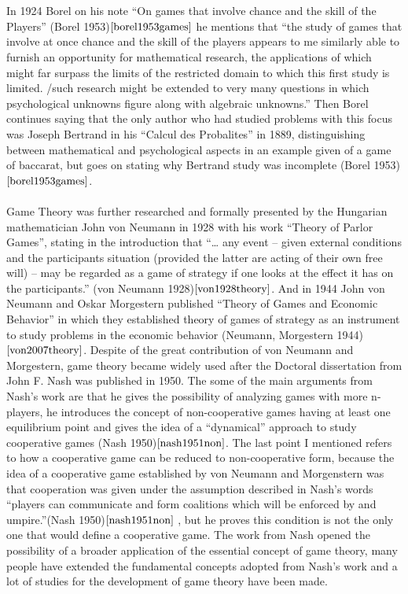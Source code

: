 \documentclass{article}
\begin{document}
\\\\ In 1924 Borel on his note ``On games that involve chance and the skill of the Players'' (Borel 1953)$\cite{borel1953games}$ he mentions that ``the study of games that involve at once chance and the skill of the players appears to me similarly able to furnish an opportunity for mathematical research, the applications of which might far surpass the limits of the restricted domain to which this first study is limited. /such research might be extended to very many questions in which psychological unknowns figure along with algebraic unknowns.'' Then Borel continues saying that the only author who had studied problems with this focus was Joseph Bertrand in his ``Calcul des Probalites'' in 1889, distinguishing between mathematical and psychological aspects in an example given of a game of baccarat, but goes on stating why Bertrand study was incomplete (Borel 1953)$\cite{borel1953games}$.
\\\\ Game Theory was further researched and formally presented by the Hungarian mathematician John von Neumann in 1928 with his work “Theory of Parlor Games”, stating in the introduction that ``… any event – given external conditions and the participants situation (provided the latter are acting of their own free will) – may be regarded as a game of strategy if one looks at the effect it has on the participants.” (von Neumann 1928)$\cite{von1928theory}$. And in 1944 John von Neumann and Oskar Morgestern published “Theory of Games and Economic Behavior” in which they established theory of games of strategy as an instrument to study problems in the economic behavior (Neumann, Morgestern 1944)$\cite{von2007theory}$. 
Despite of the great contribution of von Neumann and Morgestern, game theory became widely used after the Doctoral dissertation from John F. Nash was published in 1950. The some of the main arguments from Nash’s work are that he gives the possibility of analyzing games with more n-players, he introduces the concept of non-cooperative games having at least one equilibrium point and gives the idea of a “dynamical” approach to study cooperative games (Nash 1950)$\cite{nash1951non}$. The last point I mentioned refers to how a cooperative game can be reduced to non-cooperative form, because the idea of a cooperative game established by von Neumann and Morgenstern was that cooperation was given under the assumption described in Nash’s words “players can communicate and form coalitions which will be enforced by and umpire.”(Nash 1950)$\cite{nash1951non}$ , but he proves this condition is not the only one that would define a cooperative game. The work from Nash opened the possibility of a broader application of the essential concept of game theory, many people have extended the fundamental concepts adopted from Nash’s work and a lot of studies for the development of game theory have been made.
\end{document}
